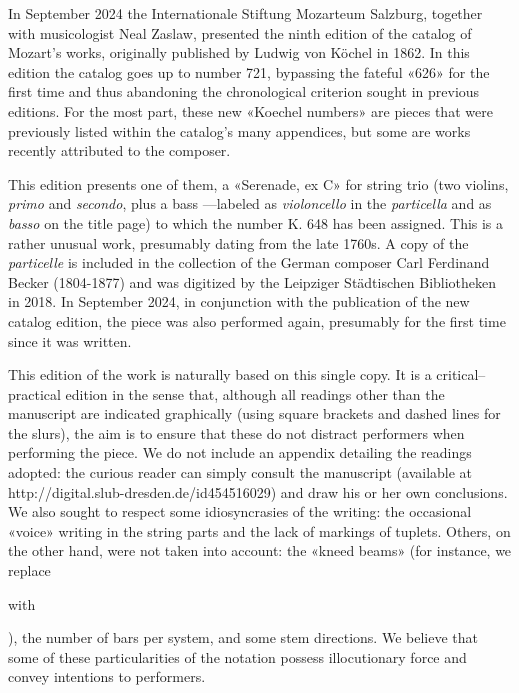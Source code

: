 In September 2024 the Internationale Stiftung Mozarteum Salzburg, together with musicologist Neal Zaslaw, presented the ninth edition of the catalog of Mozart's works, originally published by Ludwig von Köchel in 1862. In this edition the catalog goes up to number 721, bypassing the fateful «626» for the first time and thus abandoning the chronological criterion sought in previous editions. For the most part, these new «Koechel numbers» are pieces that were previously listed within the catalog's many appendices, but some are works recently attributed to the composer. 

This edition presents one of them, a «Serenade, ex C» for string trio (two violins, \emph{primo} and \emph{secondo}, plus a bass ---labeled as \emph{violoncello} in the \emph{particella} and as \emph{basso} on the title page) to which the number K. 648 has been assigned. This is a rather unusual work, presumably dating from the late 1760s. A copy of the \emph{particelle} is included in the collection of the German composer Carl Ferdinand Becker (1804-1877) and was digitized by the Leipziger Städtischen Bibliotheken in 2018. In September 2024, in conjunction with the publication of the new catalog edition, the piece was also performed again, presumably for the first time since it was written. 

This edition of the work is naturally based on this single copy. It is a critical--practical edition in the sense that, although all readings other than the manuscript are indicated graphically (using square brackets and dashed lines for the slurs), the aim is to ensure that these do not distract performers when performing the piece. We do not include an appendix detailing the readings adopted: the curious reader can simply consult the manuscript (available at http://digital.slub-dresden.de/id454516029) and draw his or her own conclusions. We also sought to respect some idiosyncrasies of the writing: the occasional «voice» writing in the string parts and the lack of markings of tuplets. Others, on the other hand, were not taken into account: the «kneed beams» (for instance, we replace 
    with 
), the number of bars per system, and some stem directions. We believe that some of these particularities of the notation possess illocutionary force and convey intentions to performers. 

